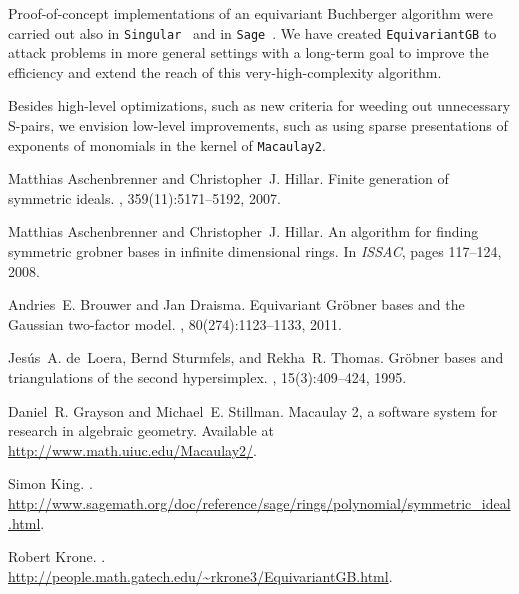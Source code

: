 \documentclass[10pt]{amsart}
\theoremstyle{definition}
\theoremstyle{remark}
\numberwithin{equation}{section}
\newcommand{\<}{\langle}
\renewcommand{\>}{\rangle}
\begin{document}
Proof-of-concept implementations of an equivariant Buchberger algorithm were carried out also in {\tt Singular}~\cite{Aschenbrenner-Hillar:ISSAC} and in {\tt Sage}~\cite{SAGE:symmetric-GB}. We have created {\tt EquivariantGB} to attack problems in more general settings with a long-term goal to improve the efficiency and extend the reach of this very-high-complexity algorithm.

Besides high-level optimizations, such as new criteria for weeding out unnecessary S-pairs, we envision low-level improvements, such as using sparse presentations of exponents of monomials in the kernel of {\tt Macaulay2}. 


%

\def\cprime{$'$}
\begin{thebibliography}{1}

Matthias Aschenbrenner and Christopher~J. Hillar.
\newblock Finite generation of symmetric ideals.
, 359(11):5171--5192, 2007.

Matthias Aschenbrenner and Christopher~J. Hillar.
\newblock An algorithm for finding symmetric grobner bases in infinite
  dimensional rings.
\newblock In {\em ISSAC}, pages 117--124, 2008.

Andries~E. Brouwer and Jan Draisma.
\newblock Equivariant {G}r\"obner bases and the {G}aussian two-factor model.
, 80(274):1123--1133, 2011.

Jes{\'u}s~A. de~Loera, Bernd Sturmfels, and Rekha~R. Thomas.
\newblock Gr\"obner bases and triangulations of the second hypersimplex.
, 15(3):409--424, 1995.

Daniel~R. Grayson and Michael~E. Stillman.
\newblock Macaulay 2, a software system for research in algebraic geometry.
\newblock Available at \url{http://www.math.uiuc.edu/Macaulay2/}.

Simon King.
.
\newblock
  \\ \url{http://www.sagemath.org/doc/reference/sage/rings/polynomial/symmetric_ideal.html}.

Robert Krone.
.
\newblock \\ \url{http://people.math.gatech.edu/~rkrone3/EquivariantGB.html}.

\end{thebibliography}
\end{document}
